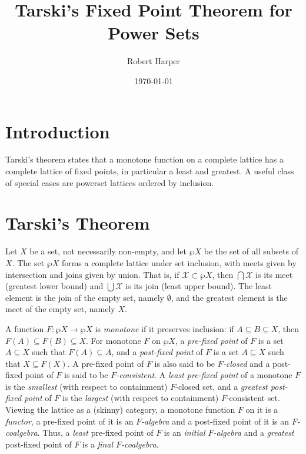 \documentclass[11pt,twoside]{article}
\begin{document}
\title{Tarski's Fixed Point Theorem for Power Sets}
\author{Robert Harper}
\date{\today}

\maketitle{}

\section{Introduction}

Tarski's theorem states that a monotone function on a complete lattice has a complete
lattice of fixed points, in particular a least and greatest. A useful class of special
cases are powerset lattices ordered by inclusion.

\section{Tarski's Theorem}

Let $X$ be a set, not necessarily non-empty, and let $\wp{X}$ be the set of all subsets of
$X$. The set $\wp{X}$ forms a complete lattice under set inclusion, with meets given by
intersection and joins given by union. That is, if $\mathcal{X}\subset\wp{X}$, then
$\bigcap{\mathcal{X}}$ is its meet (greatest lower bound) and $\bigcup{\mathcal{X}}$ is
its join (least upper bound). The least element is the join of the empty set, namely
$\emptyset$, and the greatest element is the meet of the empty set, namely $X$.

A function $F:\wp{X}\to\wp{X}$ is \emph{monotone} if it preserves inclusion: if
$A\subseteq B\subseteq X$, then $F(A)\subseteq F(B)\subseteq X$. For monotone $F$ on
$\wp{X}$, a \emph{pre-fixed point} of $F$ is a set $A\subseteq X$ such that
$F(A)\subseteq A$, and a \emph{post-fixed point} of $F$ is a set $A\subseteq X$ such that
$X\subseteq F(X)$. A pre-fixed point of $F$ is also said to be \emph{$F$-closed} and a post-fixed
point of $F$ is said to be \emph{$F$-consistent}. A \emph{least pre-fixed point} of a
monotone $F$ is the \emph{smallest} (with respect to containment) $F$-closed set, and a
\emph{greatest post-fixed point} of $F$ is the \emph{largest} (with respect to
containment) $F$-consistent set.  Viewing the lattice as a (skinny) category, a monotone
function $F$ on it is a \emph{functor}, a pre-fixed point of it is an \emph{$F$-algebra}
and a post-fixed point of it is an \emph{$F$-coalgebra}. Thus, a \emph{least} pre-fixed
point of $F$ is an \emph{initial $F$-algebra} and a \emph{greatest} post-fixed point of
$F$ is a \emph{final $F$-coalgebra}.
\end{document}
